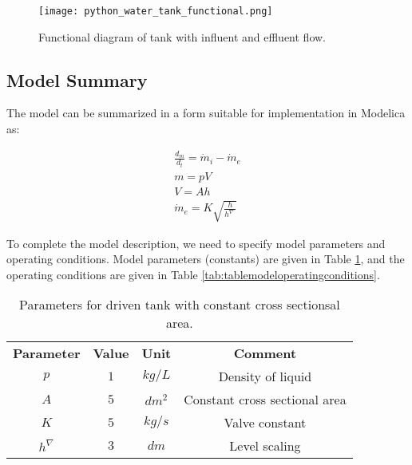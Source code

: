 \begin{figure}
	\texttt{[image: python\_water\_tank\_functional.png]}
	\caption{Functional diagram of tank with influent and effluent flow.}
	\label{fig:pythonwatertankfunctional}
\end{figure}

\subsection{Model Summary}
\label{subsec:pythonmodelsummary}

The model can be summarized in a form suitable for implementation in Modelica as:

\begin{equation*}
	\begin{aligned}
	    \frac{d_m}{d_t} = \dot{m}_i - \dot{m}_e \\
	     m = pV \\
	     V = Ah \\
	     \dot{m}_e = K\sqrt{\frac{h}{h^{\nabla^.}}} 
	\end{aligned}
\end{equation*}

To complete the model description, we need to specify model parameters and operating conditions. Model parameters
(constants) are given in Table \ref{tab:tablemodelparameters}, and the operating conditions are given in Table \ref{tab:tablemodeloperatingconditions}.

\begin{table}
	\begin{center}
		\caption{Parameters for driven tank with constant cross sectionsal area.} 
		\label{tab:tablemodelparameters} 
		\begin{tabular}{ cccc } 
			\hline
			\bfseries Parameter & \bfseries Value  & \bfseries Unit  & \bfseries Comment \\ 
			$p$ & $1$ & $kg/L $ & Density of liquid \\ 
			$A$ & $5$ & $dm^2$ & Constant cross sectional area \\ 
			$K$ & $5$ & $kg/s$ & Valve constant \\
			$h^{\nabla}$ & $3$ & $dm$ & Level scaling \\  
			\hline
		\end{tabular}
	\end{center}
\end{table}

